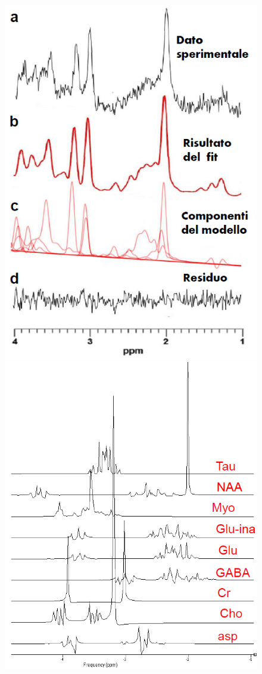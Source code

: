 \documentclass{report}
\numberwithin{equation}{section}
\numberwithin{figure}{section}
\begin{document}
\begin{figure}[htp]
\centering
\includegraphics[scale=0.7]{immagini/fit.png}\quad\includegraphics[scale=0.7]{immagini/meta2.png}

\end{figure}
\end{document}
